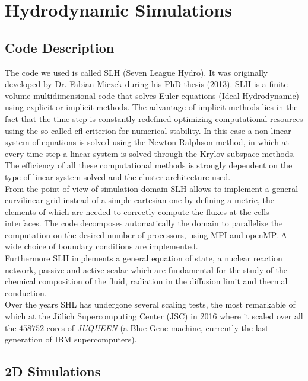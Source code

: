 
\chapter{Hydrodynamic Simulations}
\section{Code Description}

The code we used is called SLH (Seven League Hydro). It was originally developed by Dr. Fabian Miczek during his PhD thesis (2013). SLH is a finite-volume multidimensional code that solves Euler equations (Ideal Hydrodynamic) using explicit or implicit methods. The advantage of implicit methods lies in the fact that the time step is constantly redefined optimizing computational resources using the so called cfl criterion for numerical stability. In this case a non-linear system of equations is solved using the Newton-Ralphson method, in which at every time step a linear system is solved through the Krylov subspace methods. The efficiency of all these computational methods is strongly dependent on the type of linear system solved and the cluster architecture used. \\
From the point of view of simulation domain SLH allows to implement a general curvilinear grid instead of a simple cartesian one by defining a metric, the elements of which are needed to correctly compute the fluxes at the cells interfaces. The code decomposes automatically the domain to parallelize the computation on the desired number of processors, using MPI and openMP. A wide choice of boundary conditions are implemented. \\
Furthermore SLH implements a general equation of state, a nuclear reaction network, passive and active scalar which are fundamental for the study of the chemical composition of the fluid, radiation in the diffusion limit and thermal conduction. \\
Over the years SHL has undergone several scaling tests, the most remarkable of which at the Jülich Supercomputing Center (JSC) in 2016 where it scaled over all the $458752$ cores of \textit{JUQUEEN} (a Blue Gene machine, currently the last generation of IBM supercomputers).
\section{2D Simulations}
